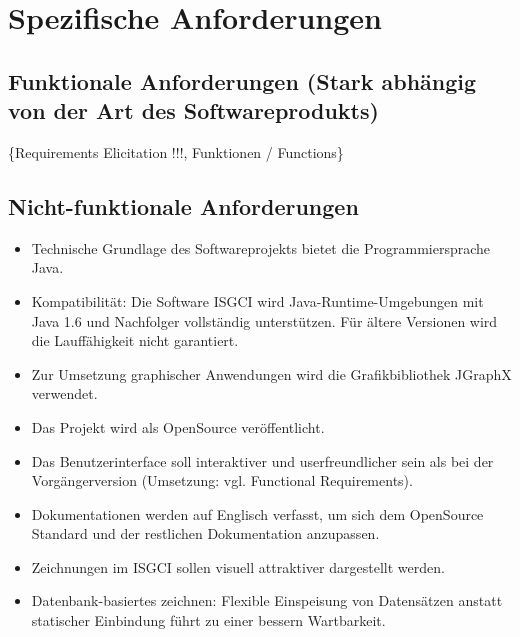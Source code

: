 \documentclass[11pt,a4paper]{article}
\begin{document}
\section{Spezifische Anforderungen} %
	\subsection{Funktionale Anforderungen (Stark abhängig von der Art des Softwareprodukts)} %
	\{Requirements Elicitation !!!, Funktionen / Functions\}
	
	\subsection{Nicht-funktionale Anforderungen} %
		\begin{itemize}
		\item Technische Grundlage des Softwareprojekts bietet die Programmiersprache Java.
		\item Kompatibilität: Die Software ISGCI wird Java-Runtime-Umgebungen mit Java 1.6 und Nachfolger vollständig unterstützen. Für ältere Versionen wird die Lauffähigkeit nicht garantiert.
		\item Zur Umsetzung graphischer Anwendungen wird die Grafikbibliothek JGraphX verwendet.
		\item Das Projekt wird als OpenSource veröffentlicht.
		\item Das Benutzerinterface soll interaktiver und userfreundlicher sein als bei der Vorgängerversion (Umsetzung: vgl. Functional Requirements).
		\item Dokumentationen werden auf Englisch verfasst, um sich dem OpenSource Standard und der restlichen Dokumentation anzupassen.
		\item Zeichnungen im ISGCI sollen visuell attraktiver dargestellt werden.
		\item Datenbank-basiertes zeichnen: Flexible Einspeisung von Datensätzen anstatt statischer Einbindung führt zu einer bessern Wartbarkeit.
		\end{itemize}
		
\end{document}
